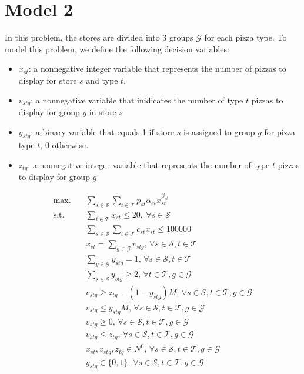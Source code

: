 \documentclass[a4, 11pt]{article}
\begin{document}
\section{Model 2}
In this problem, the stores are divided into 3 groups $\mathcal{G}$ for each pizza type.
To model this problem, we define the following decision variables:

\begin{itemize}
	\item $x_{st}$: a nonnegative integer variable that represents the number of pizzas to display for store $s$ and type $t$.
	\item $v_{stg}$: a nonnegative variable that inidicates the number of type $t$ pizzas to display for group $g$ in store $s$
	\item $y_{stg}$: a binary variable that equals 1 if store $s$ is assigned to group $g$ for pizza type $t$, 0 otherwise.
	\item $z_{tg}$: a nonnegative integer variable that represents the number of type $t$ pizzas to display for group $g$
\end{itemize}

\begin{align}
	\text{max.} &\quad \sum_{s \in \mathcal{S}} \sum_{t \in \mathcal{T}} p_{st} \alpha_{st} x_{st}^{\beta_{st}} \label{m2-obj} \\
	\text{s.t.} &\quad  \sum_{t \in \mathcal{T}} x_{st} \leq 20, \ \forall s \in \mathcal{S} \label{m2-cons1} \\
	&\quad \sum_{s \in \mathcal{S}} \sum_{t \in \mathcal{T}} c_{st} x_{st} \leq 100000 \label{m2-cons2} \\
	&\quad x_{st} = \sum_{g \in \mathcal{G}} v_{stg}, \, \forall s \in \mathcal{S}, t \in \mathcal{T} \label{m2-cons3} \\
	&\quad \sum_{g \in \mathcal{G}} y_{stg} = 1, \, \forall s \in \mathcal{S}, t \in \mathcal{T} \label{m2-cons4} \\
	&\quad \sum_{s \in \mathcal{S}} y_{stg} \geq 2, \, \forall t \in \mathcal{T}, g \in \mathcal{G} \label{m2-cons5} \\
	&\quad v_{stg} \geq z_{tg} - (1 - y_{stg}) M, \, \forall s \in \mathcal{S}, t \in \mathcal{T}, g \in \mathcal{G} \label{m2-cons6} \\
	&\quad v_{stg} \leq y_{stg} M, \, \forall s \in \mathcal{S}, t \in \mathcal{T}, g \in \mathcal{G} \label{m2-cons7}  \\
	&\quad v_{stg} \geq 0, \, \forall s \in \mathcal{S}, t \in \mathcal{T}, g \in \mathcal{G} \label{m2-cons8} \\
	&\quad v_{stg} \leq z_{tg}, \, \forall s \in \mathcal{S}, t \in \mathcal{T}, g \in \mathcal{G} \label{m2-cons9} \\
	&\quad x_{st}, v_{stg}, z_{tg} \in N^0, \, \forall s \in \mathcal{S}, t \in \mathcal{T}, g \in \mathcal{G} \label{m2-cons10} \\
	&\quad y_{stg} \in \{0, 1\}, \, \forall s \in \mathcal{S}, t \in \mathcal{T}, g \in \mathcal{G} \label{m2-cons11}
\end{align}
\end{document}

